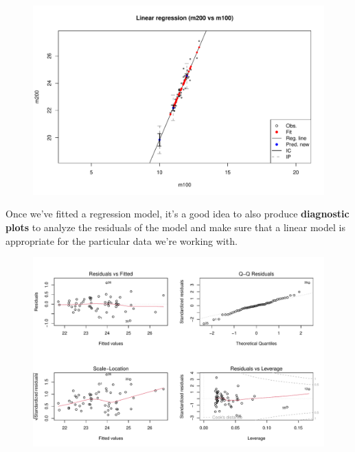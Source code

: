 \documentclass[a4paper]{article}
\begin{document}
    \begin{figure}[!htp]
        \centering
        \includegraphics[width=\textwidth]{img/example-analysis-of-quantitative-data-6.pdf}
    \end{figure}

    \newpage

    \noindent
    Once we've fitted a regression model, it's a good idea to also produce \textbf{diagnostic plots} to analyze the residuals of the model and make sure that a linear model is appropriate for the particular data we're working with.

    
    
    \begin{figure}[!htp]
        \centering
        \includegraphics[width=\textwidth]{img/example-analysis-of-quantitative-data-7.pdf}
    \end{figure}
\end{document}
